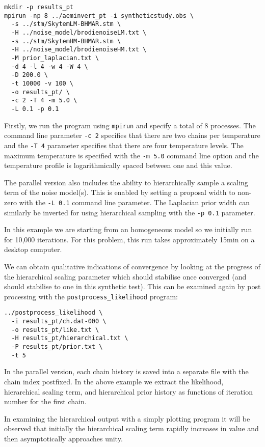 \documentclass[a4paper,12pt]{article}
\begin{document}
\begin{verbatim}
mkdir -p results_pt
mpirun -np 8 ../aeminvert_pt -i syntheticstudy.obs \
  -s ../stm/SkytemLM-BHMAR.stm \
  -H ../noise_model/brodienoiseLM.txt \
  -s ../stm/SkytemHM-BHMAR.stm \
  -H ../noise_model/brodienoiseHM.txt \
  -M prior_laplacian.txt \
  -d 4 -l 4 -w 4 -W 4 \
  -D 200.0 \
  -t 10000 -v 100 \
  -o results_pt/ \
  -c 2 -T 4 -m 5.0 \
  -L 0.1 -p 0.1
\end{verbatim}

Firstly, we run the program using {\tt mpirun} and specify a total of
8 processes. The command line parameter {\tt -c 2} specifies that
there are two chains per temperature and the {\tt -T 4} parameter
specifies that there are four temperature levels. The maximum
temperature is specified with the {\tt -m 5.0} command line option and
the temperature profile is logarithmically spaced between one and this
value.

The parallel version also includes the ability to hierarchically
sample a scaling term of the noise model(s). This is enabled
by setting a proposal width to non-zero with the {\tt -L 0.1}
command line parameter. The Laplacian prior width can similarly
be inverted for using hierarchical sampling with the {\tt -p 0.1}
parameter.

In this example we are starting from an homogeneous model so we
initially run for 10,000 iterations. For this problem, this
run takes approximately 15min on a desktop computer.

We can obtain qualitative indications of convergence by looking at
the progress of the hierarchical scaling parameter which should
stabilise once converged (and should stabilise to one in this
synthetic test). This can be examined again by post processing
with the {\tt postprocess\_likelihood}
program:

\begin{verbatim}
../postprocess_likelihood \
  -i results_pt/ch.dat-000 \
  -o results_pt/like.txt \
  -H results_pt/hierarchical.txt \
  -P results_pt/prior.txt \
  -t 5
\end{verbatim}

In the parallel version, each chain history is saved into a separate
file with the chain index postfixed. In the above example we extract
the likelihood, hierarchical scaling term, and hierarchical prior history
as functions of iteration number for the first chain.

In examining the hierarchical output with a simply plotting program
it will be observed that initially the hierarchical scaling term rapidly
increases in value and then asymptotically approaches unity.
\end{document}
